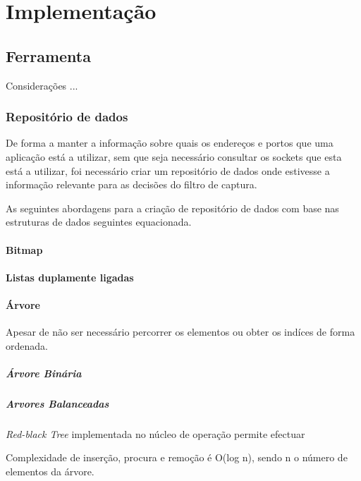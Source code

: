 \chapter{Implementação}
\label{cap:Implementacao}

\section{Ferramenta}
Considerações ...

\subsection{Repositório de dados}

De forma a manter a informação sobre quais os endereços e portos que uma
aplicação está a utilizar, sem que seja necessário consultar os sockets que
esta está a utilizar, foi necessário criar um repositório de dados onde
estivesse a informação relevante para as decisões do filtro de captura.

As seguintes abordagens para a criação de repositório de dados com base nas
estruturas de dados seguintes equacionada.

\subsubsection{Bitmap}

\subsubsection{Listas duplamente ligadas}

\subsubsection{Árvore}
Apesar de não ser necessário percorrer os elementos ou obter os indíces de
forma ordenada. 

\paragraph{Árvore Binária}


\paragraph{Arvores Balanceadas}
\textit{Red-black Tree} implementada no núcleo de operação permite efectuar

Complexidade de inserção, procura e remoção é O(log n), sendo n o número de
elementos da árvore.

